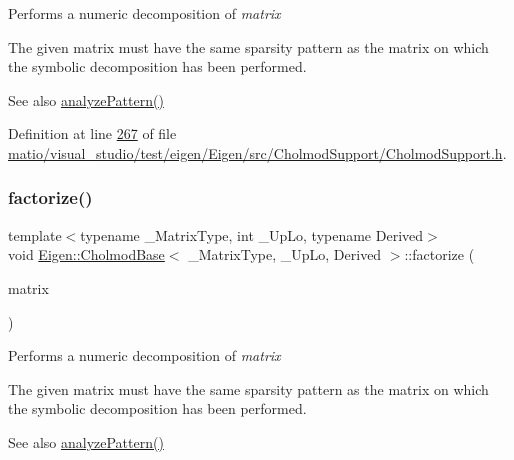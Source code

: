 Performs a numeric decomposition of {\itshape matrix} 

The given matrix must have the same sparsity pattern as the matrix on which the symbolic decomposition has been performed.

\begin{DoxySeeAlso}{See also}
\hyperlink{class_eigen_1_1_cholmod_base_a5ac967e9f4ccfc43ca9e610b89232c24}{analyze\+Pattern()} 
\end{DoxySeeAlso}


Definition at line \hyperlink{matio_2visual__studio_2test_2eigen_2_eigen_2src_2_cholmod_support_2_cholmod_support_8h_source_l00267}{267} of file \hyperlink{matio_2visual__studio_2test_2eigen_2_eigen_2src_2_cholmod_support_2_cholmod_support_8h_source}{matio/visual\+\_\+studio/test/eigen/\+Eigen/src/\+Cholmod\+Support/\+Cholmod\+Support.\+h}.

\mbox{\label{class_eigen_1_1_cholmod_base_a5bd9c9ec4d1c15f202a6c66b5e9ef37b}} 
\subsubsection{\texorpdfstring{factorize()}{factorize()}\hspace{0.1cm}{\footnotesize\ttfamily [2/2]}}
{\footnotesize\ttfamily template$<$typename \+\_\+\+Matrix\+Type, int \+\_\+\+Up\+Lo, typename Derived$>$ \\
void \hyperlink{class_eigen_1_1_cholmod_base}{Eigen\+::\+Cholmod\+Base}$<$ \+\_\+\+Matrix\+Type, \+\_\+\+Up\+Lo, Derived $>$\+::factorize (\begin{DoxyParamCaption}\item[{const Matrix\+Type \&}]{matrix }\end{DoxyParamCaption})\hspace{0.3cm}{\ttfamily [inline]}}

Performs a numeric decomposition of {\itshape matrix} 

The given matrix must have the same sparsity pattern as the matrix on which the symbolic decomposition has been performed.

\begin{DoxySeeAlso}{See also}
\hyperlink{class_eigen_1_1_cholmod_base_a5ac967e9f4ccfc43ca9e610b89232c24}{analyze\+Pattern()} 
\end{DoxySeeAlso}


